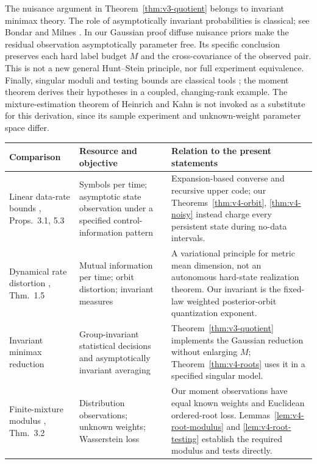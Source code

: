 The nuisance argument in Theorem~\ref{thm:v3-quotient} belongs to
invariant minimax theory. The role of asymptotically invariant
probabilities is classical; see Bondar and Milnes
\cite{BondarMilnes1981}. In our Gaussian proof diffuse nuisance priors
make the residual observation asymptotically parameter free. Its
specific conclusion preserves each hard label budget $M$ and the
cross-covariance of the observed pair. This is not a new general
Hunt--Stein principle, nor full experiment equivalence. Finally,
singular moduli and testing bounds are classical tools
\cite{DonohoLiu1991}; the moment theorem derives their hypotheses in
a coupled, changing-rank example. The mixture-estimation theorem
of Heinrich and Kahn \cite{HeinrichKahn2015} is not invoked as a
substitute for this derivation, since its sample experiment and
unknown-weight parameter space differ.

\begin{center}
\small
\begin{longtable}{@{}p{}p{}p{}@{}}
\toprule
Comparison & Resource and objective & Relation to the present statements\\
\midrule
\endhead
Linear data-rate bounds \cite{TatikondaMitter2004},
Props.\ 3.1, 5.3
& Symbols per time; asymptotic state observation under a specified
control-information pattern
& Expansion-based converse and recursive upper code; our
Theorems~\ref{thm:v4-orbit}, \ref{thm:v4-noisy} instead charge every
persistent state during no-data intervals.\\[5pt]
Dynamical rate distortion \cite{LindenstraussTsukamoto2018},
Thm.\ 1.5
& Mutual information per time; orbit distortion; invariant measures
& A variational principle for metric mean dimension, not an
autonomous hard-state realization theorem. Our invariant is the
fixed-law weighted posterior-orbit quantization exponent.\\[5pt]
Invariant minimax reduction \cite{BondarMilnes1981}
& Group-invariant statistical decisions and asymptotically invariant
averaging
& Theorem~\ref{thm:v3-quotient} implements the Gaussian reduction
without enlarging $M$; Theorem~\ref{thm:v4-roots} uses it in a
specified singular model.\\[5pt]
Finite-mixture modulus \cite{HeinrichKahn2015}, Thm.\ 3.2
& Distribution observations; unknown weights; Wasserstein loss
& Our moment observations have equal known weights and Euclidean
ordered-root loss. Lemmas~\ref{lem:v4-root-modulus} and
\ref{lem:v4-root-testing} establish the required modulus and tests
directly.\\
\bottomrule
\end{longtable}
\end{center}

